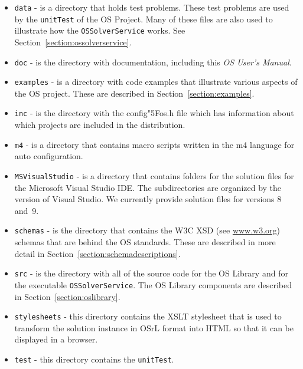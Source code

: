 \documentclass[11pt]{article}
\renewcommand{\_}{{\char"5F}}
\renewcommand{\{}{{\char"7B}}
\renewcommand{\}}{{\char"7D}}
\renewcommand{\^}{{\char"0D}}
\renewcommand{\'}{{\char"0D}}
\begin{document}
\begin{enumerate}[Step 1:]
\begin{itemize}
\item {\tt data} - is a directory that holds test problems. These test problems are used by the 
{\tt unitTest} of the OS Project. Many of these files are also used to illustrate 
how the {\tt OSSolverService} works. 
See Section~\ref{section:ossolverservice}.

\item {\tt doc} - is the directory with documentation, including this {\it OS User's Manual}.

\item {\tt examples} - is a directory with code examples that illustrate various aspects of the OS project.    
These are described in Section~\ref{section:examples}.

\item {\tt inc} - is the directory with the config\_os.h file which has information about which projects 
are included in the distribution.

\item {\tt m4} - is a directory that  contains macro scripts written in the m4 language for auto configuration.

\item {\tt MSVisualStudio} - is a directory that  contains folders for the solution files for the 
Microsoft Visual Studio IDE.  The subdirectories are organized by the version 
of Visual Studio. We currently provide solution files for versions 8 and~9.

\item {\tt schemas} - is the directory that contains the W3C XSD (see \url{www.w3.org}) schemas that are 
behind the OS standards. These are described in more detail in Section~\ref{section:schemadescriptions}.

\item {\tt src} - is the directory with all of the source code for the OS Library and for the executable 
{\tt OSSolverService}. The OS Library components are described in Section~\ref{section:oslibrary}.

\item {\tt stylesheets} - this directory contains the XSLT stylesheet that is used to transform the solution 
instance in OSrL format into HTML so that it can be displayed in a browser.

\item {\tt test} - this directory contains the {\tt unitTest}.



\end{itemize}
\end{enumerate}
\end{document}
